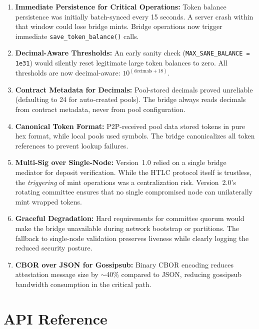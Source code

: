 \documentclass[11pt,a4paper]{article}
\begin{document}
\begin{enumerate}
    \item \textbf{Immediate Persistence for Critical Operations:} Token balance persistence was initially batch-synced every 15 seconds. A server crash within that window could lose bridge mints. Bridge operations now trigger immediate \texttt{save\_token\_balance()} calls.

    \item \textbf{Decimal-Aware Thresholds:} An early sanity check (\texttt{MAX\_SANE\_BALANCE = 1e31}) would silently reset legitimate large token balances to zero. All thresholds are now decimal-aware: $10^{(\text{decimals} + 18)}$.

    \item \textbf{Contract Metadata for Decimals:} Pool-stored decimals proved unreliable (defaulting to 24 for auto-created pools). The bridge always reads decimals from contract metadata, never from pool configuration.

    \item \textbf{Canonical Token Format:} P2P-received pool data stored tokens in pure hex format, while local pools used symbols. The bridge canonicalizes all token references to prevent lookup failures.

    \item \textbf{Multi-Sig over Single-Node:} Version~1.0 relied on a single bridge mediator for deposit verification. While the HTLC protocol itself is trustless, the \emph{triggering} of mint operations was a centralization risk. Version~2.0's rotating committee ensures that no single compromised node can unilaterally mint wrapped tokens.

    \item \textbf{Graceful Degradation:} Hard requirements for committee quorum would make the bridge unavailable during network bootstrap or partitions. The fallback to single-node validation preserves liveness while clearly logging the reduced security posture.

    \item \textbf{CBOR over JSON for Gossipsub:} Binary CBOR encoding reduces attestation message size by $\sim$40\% compared to JSON, reducing gossipsub bandwidth consumption in the critical path.
\end{enumerate}

\section{API Reference}
\label{sec:api}
\end{document}

